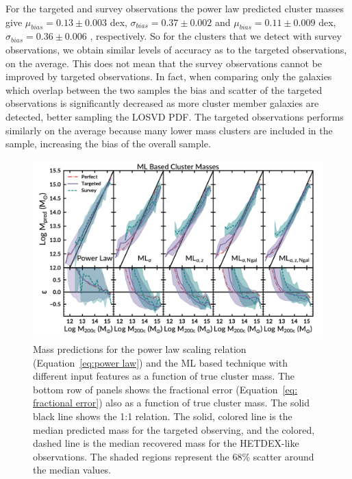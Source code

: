 \documentclass[fleqn,usenatbib]{mnras}
\newcommand{\editorial}[1]{\textcolor{red}{#1}}
\begin{document}

For the targeted and survey observations the power law predicted cluster masses give $\mu_{bias} =0.13\pm{0.003}$ dex, $\sigma_{bias} = 0.37\pm{0.002}$ and $\mu_{bias} =0.11\pm{0.009}$ dex, $\sigma_{bias} = 0.36\pm{0.006}$ , respectively. So for the clusters that we detect with survey observations, we obtain similar levels of accuracy as to the targeted observations, on the average. This does not mean that the survey observations cannot be improved by targeted observations. In fact, when comparing only the galaxies which overlap between the two samples the bias and scatter of the targeted observations is significantly decreased as more cluster member galaxies are detected, better sampling the LOSVD PDF. The targeted observations performs similarly on the average because many lower mass clusters are included in the sample, increasing the bias of the overall sample.

\begin{figure} 
	\includegraphics[width=\textwidth]{figures/MLcomparison.pdf} 
	\caption{Mass predictions for the power law scaling relation (Equation~\ref{eq:power law}) and the ML based technique with different input features as a function of true cluster mass. The bottom row of panels shows the fractional error (Equation~\ref{eq: fractional error}) also as a function of true cluster mass. The solid black line shows the 1:1 relation. The solid, colored line is the median predicted mass for the targeted observing, and the colored, dashed line is the median recovered mass for the HETDEX-like observations. The shaded regions represent the 68\% scatter around the median values.} \label{fig: ML comparison} 
\end{figure}
\end{document}
